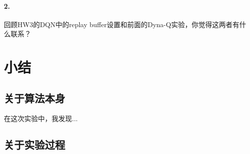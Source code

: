 \documentclass[a4paper,12pt]{article}
\begin{document}
\begin{CJK}{UTF8}{gbsn}
\paragraph{2.}回顾HW3的DQN中的replay buffer设置和前面的Dyna-Q实验，你觉得这两者有什么联系？


\section{小结}
\subsection{关于算法本身}
在这次实验中，我发现...
\subsection{关于实验过程}


\end{CJK}
\end{document}
